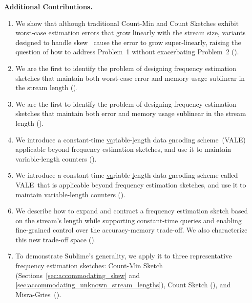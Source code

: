 \documentclass[sigconf]{acmart}
\newcommand{\sketch}{Sublime}
\newcommand{\counterencodingabbrv}{VALE}
\begin{document}
\textbf{Additional Contributions.}
\begin{enumerate}
    \item We show that although traditional Count-Min and Count Sketches exhibit worst-case estimation errors that grow linearly with the stream size, variants designed to handle skew~\cite{BitSense,PyramidSketch,StingySketch,AdaptiveCounterSplicing,CounterTree,TreeSensing,TailoredSketch,SALSA} cause the error to grow super-linearly, raising the question of how to address Problem~1 without exacerbating Problem~2 ().

    \iftods
    \item We are the first to identify the problem of designing frequency estimation sketches that maintain both worst-case error and memory usage sublinear in the stream length ().
    \else
    \item We are the first to identify the problem of designing frequency estimation sketches that maintain both error and memory usage sublinear in the stream length ().
    \fi


    \iftods
    \item We introduce a constant-time \underline{va}riable-\underline{l}ength data \underline{e}ncoding scheme~(\counterencodingabbrv) applicable beyond frequency estimation sketches, and use it to maintain variable-length counters ().
    \else
    \item We introduce a constant-time \underline{va}riable-\underline{l}ength data \underline{e}ncoding scheme called \counterencodingabbrv\ that is applicable beyond frequency estimation sketches, and use it to maintain variable-length counters ().
    \fi

    \item We describe how to expand and contract a frequency estimation sketch based on the stream's length while supporting constant-time queries and enabling fine-grained control over the accuracy-memory trade-off.
        We also characterize this new trade-off space ().

    \item To demonstrate \sketch's generality, we apply it to three representative frequency estimation sketches: Count-Min Sketch (Sections~\ref{sec:accommodating_skew} and \ref{sec:accommodating_unknown_stream_lengths}), Count Sketch (), and \mbox{Misra-Gries ()}.
      


\end{enumerate}
\end{document}
